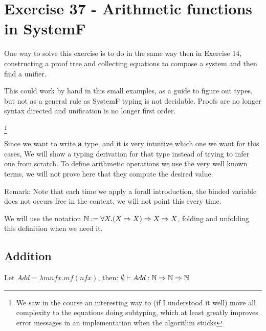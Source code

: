 \newcommand{\NatF}
           {\forall X. (X \Rightarrow X) \Rightarrow X \Rightarrow X}

           
\newcommand{\Arr}
           {\Rightarrow}

           
\section{Exercise 37 - Arithmetic functions in SystemF}

One way to solve this exercise is to do in the same way then in Exercise
14, constructing a proof tree and collecting equations
to compose a system and then find a unifier.

This could work by hand in this small examples, as a guide to figure out
types, but not as a general rule as SystemF typing is not decidable.
Proofs are no longer syntax directed and unification is no longer first
order.

\footnote{We saw in the course an interesting way to
  (if I understood it well) move all complexity to the equations
  doing subtyping, which at least greatly improves error messages in
  an implementation when the algorithm stucks}

Since we want to write {\bf a} type, and it is very intuitive which one
we want for this cases, We will show a typing derivation for that
type instead of trying to infer one from scratch.
To define arithmetic operations we use the very well known terms, we will not
prove here that they compute the desired value.

Remark:
Note that each time we apply a forall introduction, the binded variable does
not occurs free in the context, we will not point this every time.


We will use the notation
$\N := \NatF$, folding and unfolding this definition when we
need it.

\subsection*{Addition}


\begin{theorem}
  Let $Add = \lambda m n f x . m f (n f x)$, then:
  $\emptyset \vdash Add : \N \Arr \N \Arr \N$
\end{theorem}

\newenvironment{scprooftree}[1]%
  {\gdef\scalefactor{#1}\begin{center}\proofSkipAmount \leavevmode}%
  {\scalebox{\scalefactor}{\DisplayProof}\proofSkipAmount \end{center} }


